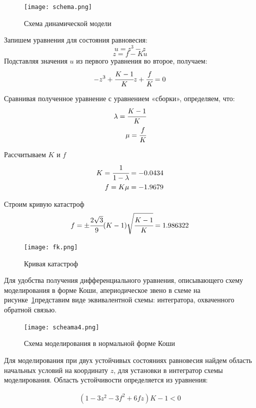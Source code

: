 \begin{figure}[h!]
	\centering
	\texttt{[image: schema.png]}
	\caption{Схема динамической модели}
	\label{schema}
\end{figure}
Запишем уравнения для состояния равновесия:
\begin{equation}
	u = z^3 - z
\end{equation}
\begin{equation}
	z = f - K u
\end{equation}
Подставляя значения $u$ из первого уравнения во второе, получаем:
\begin{equation}
	-z^3 + \cfrac{K-1}{K}z + \cfrac{f}{K} = 0
\end{equation}

Сравнивая полученное уравнение с уравнением «сборки», определяем, что:
\begin{align}
	\lambda = \cfrac{K-1}{K}\\
	\mu = \cfrac{f}{K}
\end{align}

Рассчитываем $K$ и $f$
\begin{align}
	K = \cfrac{1}{1-\lambda} = - 0.0434\\
	f = K \mu =- 1.9679 
\end{align}

Строим кривую катастроф
\begin{align}
	f = \pm \cfrac{2 \sqrt{3}}{9} (K-1) \sqrt{\cfrac{K-1}{K}} = 1.986322 
\end{align}

\begin{figure}[h!]
	\centering
	\texttt{[image: fk.png]}
	\caption{Кривая катастроф}
	\label{aaa}
\end{figure}

Для удобства получения дифференциального уравнения, описывающего схему моделирования в форме Коши, апериодическое звено в схеме на рисунке~\ref{schema}представим виде эквивалентной схемы: интегратора, охваченного обратной связью.

\begin{figure}[h!]
	\centering
	\texttt{[image: scheama4.png]}
	\caption{Схема моделирования в нормальной форме Коши}
	\label{aaa}
\end{figure}

Для моделирования при двух устойчивых состояниях равновесия найдем область начальных условий на координату $z$, для установки в интегратор схемы моделирования. Область устойчивости определяется из уравнения:

\begin{align}
(1-3 z^2 - 3 f^2 + 6 f z) K - 1 < 0
\end{align}

